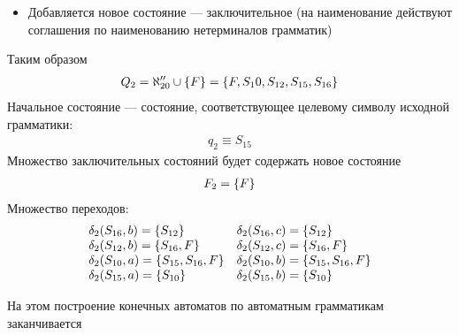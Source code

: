 \begin{itemize}
\begin{itemize}
		      \item Добавляется новое состояние --- заключительное (на наименование действуют соглашения по наименованию нетерминалов грамматик)
	      \end{itemize}
	      Таким образом
	      \begin{align*}
		      Q_2 = \aleph''_{20} \cup \left\{F\right\} = \left\{F, S_10, S_{12}, S_{15}, S_{16}\right\}
	      \end{align*}
	      Начальное состояние --- состояние, соответствующее целевому символу исходной грамматики:
	      \begin{align*}
		      q_2 \equiv S_{15}
	      \end{align*}
	      Множество заключительных состояний будет содержать новое состояние
	      \begin{align*}
		      F_2 = \left\{F\right\}
	      \end{align*}
	      Множество переходов:
	      \begin{align*}
		      \begin{array}{lll}
			      \delta_2(S_{16}, b) = \left\{S_{12}\right\}            & \delta_2(S_{16}, c) = \left\{S_{12}\right\}            \\
			      \delta_2(S_{12}, b) = \left\{S_{16}, F\right\}         & \delta_2(S_{12}, c) = \left\{S_{16}, F\right\}         \\
			      \delta_2(S_{10}, a) = \left\{S_{15}, S_{16}, F\right\} & \delta_2(S_{10}, b) = \left\{S_{15}, S_{16}, F\right\} \\
			      \delta_2(S_{15}, a) = \left\{S_{10}\right\}            & \delta_2(S_{15}, b) = \left\{S_{10}\right\}
		      \end{array}
	      \end{align*}
\end{itemize}
На этом построение конечных автоматов по автоматным грамматикам заканчивается
